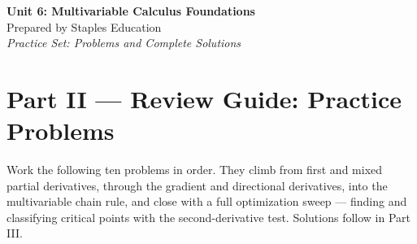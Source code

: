 




\begin{center}
    {\LARGE \bfseries Unit 6: Multivariable Calculus Foundations}\\[6pt]
    {\large Prepared by Staples Education}\\[4pt]
    {\itshape Practice Set: Problems and Complete Solutions}
\end{center}

\vspace{0.4em}

{}
\section*{Part II --- Review Guide: Practice Problems}

Work the following ten problems in order. They climb from first and mixed partial
derivatives, through the gradient and directional derivatives, into the
multivariable chain rule, and close with a full optimization sweep --- finding
and classifying critical points with the second-derivative test. Solutions follow
in Part III.

